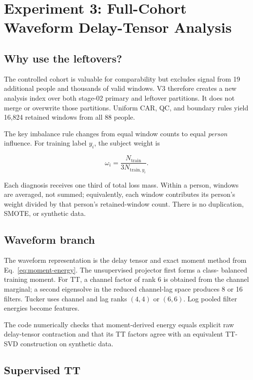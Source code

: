 \chapter{Experiment 3: Full-Cohort Waveform Delay-Tensor Analysis}
\label{ch:v3}

\section{Why use the leftovers?}

The controlled cohort is valuable for comparability but excludes signal from 19
additional people and thousands of valid windows. V3 therefore creates a new
analysis index over both stage-02 primary and leftover partitions. It does not
merge or overwrite those partitions. Uniform CAR, QC, and boundary rules yield
16,824 retained windows from all 88 people.

The key imbalance rule changes from equal window counts to equal \emph{person}
influence. For training label $y_i$, the subject weight is

\begin{equation}
\omega_i=\frac{N_{\mathrm{train}}}
{3N_{\mathrm{train},y_i}}.
\label{eq:class-weight}
\end{equation}

Each diagnosis receives one third of total loss mass. Within a person, windows
are averaged, not summed; equivalently, each window contributes its person's
weight divided by that person's retained-window count. There is no duplication,
SMOTE, or synthetic \FTD{} data.

\section{Waveform branch}

The waveform representation is the delay tensor and exact moment method from
Eq.~\ref{eq:moment-energy}. The unsupervised projector first forms a class-
balanced training moment. For TT, a channel factor of rank 6 is obtained from
the channel marginal; a second eigensolve in the reduced channel-lag space
produces 8 or 16 filters. Tucker uses channel and lag ranks $(4,4)$ or $(6,6)$.
Log pooled filter energies become features.

The code numerically checks that moment-derived energy equals explicit raw
delay-tensor contraction and that its TT factors agree with an equivalent
TT-SVD construction on synthetic data.

\section{Supervised TT}

